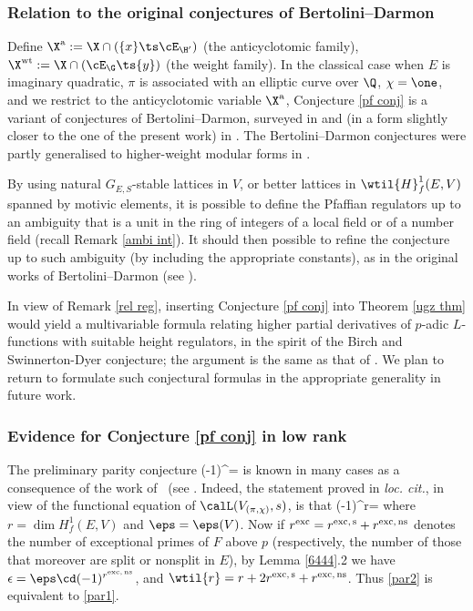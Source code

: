 \subsubsection{Relation to the original conjectures of Bertolini--Darmon} Define $\X^{\rm a}:= \X\cap ( \{x\}\ts \cE_{\H'})$ (the anticyclotomic family), $\X^{\rm wt} := \X\cap (\cE_{\G}\ts\{y\})$ (the weight family). In the classical case when $E$ is imaginary quadratic, $\pi$ is associated with an elliptic curve over $\Q$, $\chi=\one$,  and we restrict to the anticyclotomic variable $\X^{\rm a}$, Conjecture \ref{pf conj} is a variant of conjectures of Bertolini--Darmon, surveyed in \cite{bdsurvey} and (in a form slightly closer to the one of the present work) in \cite[\S~4]{dd-exc}. The Bertolini--Darmon conjectures were partly generalised to higher-weight modular forms  in \cite{LV}.


\begin{rema}
\notready By using natural  $G_{E, S}$-stable lattices in $V$, or better lattices in $\wtil{H}^{1}_{f}(E, V)$ spanned by motivic elements, it is possible to define the Pfaffian regulators up to an ambiguity that is a unit in the ring of integers of a local field or of a number field (recall Remark \ref{ambi int}). It should then possible to refine the conjecture up to such ambiguity (by including the appropriate constants), as in the original works of Bertolini--Darmon (see \cite[Conjecture 4.2.1]{dd-exc}).

In view of Remark \ref{rel reg}, inserting Conjecture \ref{pf conj} into Theorem \ref{ugz thm} would yield a multivariable formula relating higher partial derivatives of $p$-adic $L$-functions  with suitable height regulators, in the spirit of the  Birch and Swinnerton-Dyer conjecture; the argument is the same as that of  \cite[Proposition 5.1.1]{dd-exc}. We plan to return to formulate such conjectural formulas in the appropriate generality in future work.
\end{rema}





\subsubsection{Evidence for Conjecture \ref{pf conj} in low rank} The preliminary parity conjecture
\beq {}
(-1)^{}=\epsilon\eeq
is known in many cases as a consequence of the work of \nek\ (see \cite[Theorem 12.2.3]{nek-selmer}. Indeed, the statement proved  in \emph{loc. cit.}, in view of the functional equation of $\calL(V_{(\pi, \chi)},s)$, is that
\beq {}
(-1)^{r}= \eps
\eeq
 where $r=\dim H^{1}_{f}(E, V)$ and $\eps =\eps (V)$. Now if $r^{\rm exc}= r^{\rm exc, \, s}+ {r}^{\rm exc,\, ns}$ denotes the number of exceptional  primes of $F$ above $p$ (respectively, the number of those that moreover are split or nonsplit in $E$),  by Lemma \ref{6444}.2 we have $\epsilon=\eps\cd (-1)^{r^{\rm exc,\, ns}}$, and $\wtil{r}= r+2r^{\rm exc,\, s}+ r^{\rm exc, \, ns}$. Thus \eqref{par2} is equivalent to \eqref{par1}.

